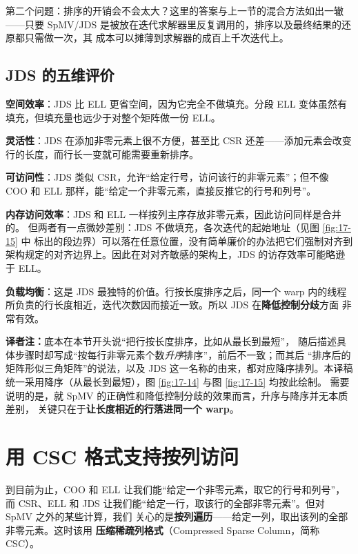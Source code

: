 第二个问题：排序的开销会不会太大？这里的答案与上一节的混合方法如出一辙——只要
SpMV/JDS 是被放在迭代求解器里反复调用的，排序以及最终结果的还原都只需做一次，其
成本可以摊薄到求解器的成百上千次迭代上。

\subsection*{JDS 的五维评价}

\textbf{空间效率}：JDS 比 ELL 更省空间，因为它完全不做填充。分段 ELL 变体虽然有
填充，但填充量也远少于对整个矩阵做一份 ELL。

\textbf{灵活性}：JDS 在添加非零元素上很不方便，甚至比 CSR 还差——添加元素会改变
行的长度，而行长一变就可能需要重新排序。

\textbf{可访问性}：JDS 类似 CSR，允许“给定行号，访问该行的非零元素”；但不像 COO 和
ELL 那样，能“给定一个非零元素，直接反推它的行号和列号”。

\textbf{内存访问效率}：JDS 和 ELL 一样按列主序存放非零元素，因此访问同样是合并的。
但两者有一点微妙差别：JDS 不做填充，各次迭代的起始地址（见图 \ref{fig:17-15} 中
 标出的段边界）可以落在任意位置，没有简单廉价的办法把它们强制对齐到
架构规定的对齐边界上。因此在对对齐敏感的架构上，JDS 的访存效率可能略逊于 ELL。

\textbf{负载均衡}：这是 JDS 最独特的价值。行按长度排序之后，同一个 warp 内的线程
所负责的行长度相近，迭代次数因而接近一致。所以 JDS 在\textbf{降低控制分歧}方面
非常有效。

\noindent\textbf{译者注：}底本在本节开头说“把行按长度排序，比如从最长到最短”，
随后描述具体步骤时却写成“按每行非零元素个数\emph{升序}排序”，前后不一致；而其后
“排序后的矩阵形似三角矩阵”的说法，以及 JDS 这一名称的由来，都对应降序排列。本译稿
统一采用降序（从最长到最短），图 \ref{fig:17-14} 与图 \ref{fig:17-15} 均按此绘制。
需要说明的是，就 SpMV 的正确性和降低控制分歧的效果而言，升序与降序并无本质差别，
关键只在于\textbf{让长度相近的行落进同一个 warp}。

\section{用 CSC 格式支持按列访问}
\label{sec:spmv-csc}

到目前为止，COO 和 ELL 让我们能“给定一个非零元素，取它的行号和列号”，而 CSR、ELL
和 JDS 让我们能“给定一行，取该行的全部非零元素”。但对 SpMV 之外的某些计算，我们
关心的是\textbf{按列遍历}——给定一列，取出该列的全部非零元素。这时该用
\textbf{压缩稀疏列格式}（Compressed Sparse Column，简称 CSC）。

